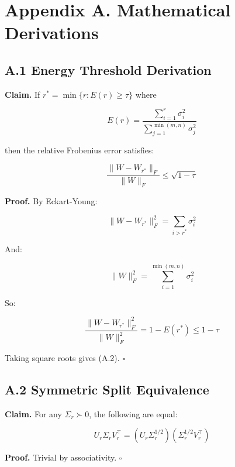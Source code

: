 \section{Appendix A. Mathematical Derivations}

\subsection{A.1 Energy Threshold Derivation}

\textbf{Claim.} If $r^* = \min\{r : E(r) \geq \tau\}$ where

\begin{equation}
E(r) = \frac{\sum_{i=1}^{r} \sigma_i^2}{\sum_{j=1}^{\min(m,n)} \sigma_j^2}
\end{equation}

then the relative Frobenius error satisfies:

\begin{equation}
\frac{\|W - W_{r^*}\|_F}{\|W\|_F} \leq \sqrt{1 - \tau}
\end{equation}

\textbf{Proof.} By Eckart-Young:

\begin{equation}
\|W - W_{r^*}\|_F^2 = \sum_{i > r^*} \sigma_i^2
\end{equation}

And:

\begin{equation}
\|W\|_F^2 = \sum_{i=1}^{\min(m,n)} \sigma_i^2
\end{equation}

So:

\begin{equation}
\frac{\|W - W_{r^*}\|_F^2}{\|W\|_F^2} = 1 - E(r^*) \leq 1 - \tau
\end{equation}

Taking square roots gives (A.2). $\square$

\subsection{A.2 Symmetric Split Equivalence}

\textbf{Claim.} For any $\Sigma_r \succ 0$, the following are equal:

\begin{equation}
U_r \Sigma_r V_r^\top = (U_r \Sigma_r^{1/2})(\Sigma_r^{1/2} V_r^\top)
\end{equation}

\textbf{Proof.} Trivial by associativity. $\square$

